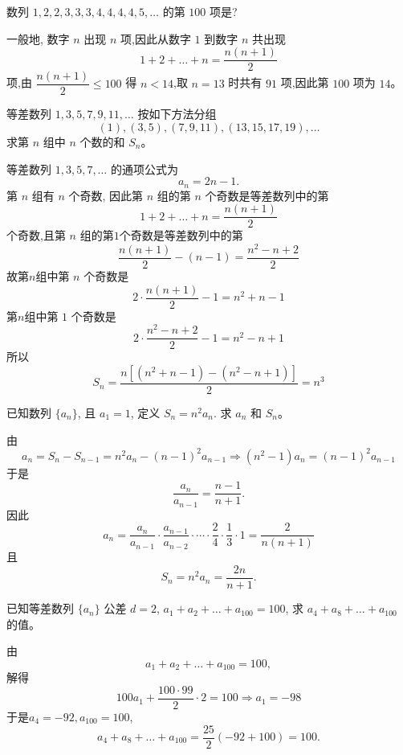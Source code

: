 \begin{questions}
    \question 数列 $1, 2, 2, 3, 3, 3, 4, 4, 4, 4, 5, \dots$ 的第 $100$ 项是?
    \begin{solution}
        一般地, 数字 $n$ 出现 $n$ 项,因此从数字 $1$ 到数字 $n$ 共出现
        \[
        1+2+\dots+n = \frac{n(n+1)}{2}
        \]
        项,由 $\dfrac{n(n+1)}{2} \leq 100$ 得 $n<14$,取 $n=13$ 时共有 $91$ 项,因此第 $100$ 项为 $14$。
    \end{solution}

    \question 等差数列 $1, 3, 5, 7, 9, 11,\dots$ 按如下方法分组
    \[
    (1),(3,5),(7,9,11),(13,15,17,19),\dots
    \]
    求第 $n$ 组中 $n$ 个数的和 $S_n$。
    \begin{solution}
        等差数列 $1,3,5,7,\dots$ 的通项公式为
        \[
        a_n = 2n-1.
        \]
        第 $n$ 组有 $n$ 个奇数, 因此第 $n$ 组的第 $n$ 个奇数是等差数列中的第
        \[
        1+2+\dots+n = \frac{n(n+1)}{2}
        \]
        个奇数,且第 $n$ 组的第$1$个奇数是等差数列中的第
        \[
        \frac{n(n+1)}{2}-(n-1)=\frac{n^2-n+2}{2}
        \]
        故第$n$组中第 $n$ 个奇数是
        \[
        2\cdot \frac{n(n+1)}{2}-1=n^2+n-1
        \]
        第$n$组中第 $1$ 个奇数是
        \[
        2\cdot \frac{n^2-n+2}{2}-1=n^2-n+1
        \]
        所以
        \[
        S_n=\frac{n[(n^2+n-1)-(n^2-n+1)]}{2}=n^3
        \]
    \end{solution}

    \question 已知数列 $\{a_n\}$, 且 $a_1=1$, 定义 $S_n=n^2 a_n$. 求 $a_n$ 和 $S_n$。
    \begin{solution}
        由
        \[
        a_n = S_n - S_{n-1} =n^2 a_n - (n-1)^2 a_{n-1} \Rightarrow (n^2-1)a_n = (n-1)^2 a_{n-1}
        \]
        于是
        \[
        \frac{a_n}{a_{n-1}} =\frac{n-1}{n+1}.
        \]
        因此
        \[
        a_n = \frac{a_n}{a_{n-1}} \cdot \frac{a_{n-1}}{a_{n-2}}\cdot\cdots\cdot \frac{2}{4}\cdot \frac{1}{3}\cdot 1 = \frac{2}{n(n+1)} 
        \]
        且
        \[
        S_n =n^2 a_n= \frac{2n}{n+1}.
        \]
    \end{solution}

    \question 已知等差数列 $\{a_n\}$ 公差 $d=2$, $a_1+a_2+\dots+a_{100}=100$, 求 $a_4+a_8+\dots+a_{100}$ 的值。
    \begin{solution}
        由
        \[
        a_1+a_2+\dots+a_{100}=100,
        \]
        解得
        \[
        100a_1 + \frac{100 \cdot 99}{2} \cdot 2 = 100\Rightarrow a_1=-98
        \]
        于是$a_4=-92,a_100=100$,
        \[
        a_4+a_8+\dots+a_{100} = \frac{25}{2}(-92+100)=100.
        \]
    \end{solution}


\end{questions}
